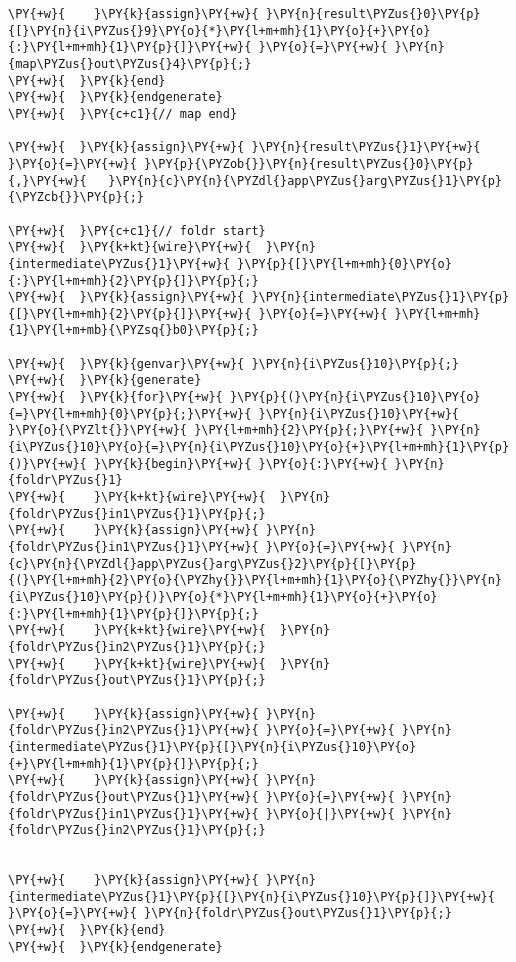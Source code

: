 {\begin{Verbatim}[commandchars=\\\{\}]
\PY{+w}{    }\PY{k}{assign}\PY{+w}{ }\PY{n}{result\PYZus{}0}\PY{p}{[}\PY{n}{i\PYZus{}9}\PY{o}{*}\PY{l+m+mh}{1}\PY{o}{+}\PY{o}{:}\PY{l+m+mh}{1}\PY{p}{]}\PY{+w}{ }\PY{o}{=}\PY{+w}{ }\PY{n}{map\PYZus{}out\PYZus{}4}\PY{p}{;}
\PY{+w}{  }\PY{k}{end}
\PY{+w}{  }\PY{k}{endgenerate}
\PY{+w}{  }\PY{c+c1}{// map end}

\PY{+w}{  }\PY{k}{assign}\PY{+w}{ }\PY{n}{result\PYZus{}1}\PY{+w}{ }\PY{o}{=}\PY{+w}{ }\PY{p}{\PYZob{}}\PY{n}{result\PYZus{}0}\PY{p}{,}\PY{+w}{   }\PY{n}{c}\PY{n}{\PYZdl{}app\PYZus{}arg\PYZus{}1}\PY{p}{\PYZcb{}}\PY{p}{;}

\PY{+w}{  }\PY{c+c1}{// foldr start}
\PY{+w}{  }\PY{k+kt}{wire}\PY{+w}{  }\PY{n}{intermediate\PYZus{}1}\PY{+w}{ }\PY{p}{[}\PY{l+m+mh}{0}\PY{o}{:}\PY{l+m+mh}{2}\PY{p}{]}\PY{p}{;}
\PY{+w}{  }\PY{k}{assign}\PY{+w}{ }\PY{n}{intermediate\PYZus{}1}\PY{p}{[}\PY{l+m+mh}{2}\PY{p}{]}\PY{+w}{ }\PY{o}{=}\PY{+w}{ }\PY{l+m+mh}{1}\PY{l+m+mb}{\PYZsq{}b0}\PY{p}{;}

\PY{+w}{  }\PY{k}{genvar}\PY{+w}{ }\PY{n}{i\PYZus{}10}\PY{p}{;}
\PY{+w}{  }\PY{k}{generate}
\PY{+w}{  }\PY{k}{for}\PY{+w}{ }\PY{p}{(}\PY{n}{i\PYZus{}10}\PY{o}{=}\PY{l+m+mh}{0}\PY{p}{;}\PY{+w}{ }\PY{n}{i\PYZus{}10}\PY{+w}{ }\PY{o}{\PYZlt{}}\PY{+w}{ }\PY{l+m+mh}{2}\PY{p}{;}\PY{+w}{ }\PY{n}{i\PYZus{}10}\PY{o}{=}\PY{n}{i\PYZus{}10}\PY{o}{+}\PY{l+m+mh}{1}\PY{p}{)}\PY{+w}{ }\PY{k}{begin}\PY{+w}{ }\PY{o}{:}\PY{+w}{ }\PY{n}{foldr\PYZus{}1}
\PY{+w}{    }\PY{k+kt}{wire}\PY{+w}{  }\PY{n}{foldr\PYZus{}in1\PYZus{}1}\PY{p}{;}
\PY{+w}{    }\PY{k}{assign}\PY{+w}{ }\PY{n}{foldr\PYZus{}in1\PYZus{}1}\PY{+w}{ }\PY{o}{=}\PY{+w}{ }\PY{n}{c}\PY{n}{\PYZdl{}app\PYZus{}arg\PYZus{}2}\PY{p}{[}\PY{p}{(}\PY{l+m+mh}{2}\PY{o}{\PYZhy{}}\PY{l+m+mh}{1}\PY{o}{\PYZhy{}}\PY{n}{i\PYZus{}10}\PY{p}{)}\PY{o}{*}\PY{l+m+mh}{1}\PY{o}{+}\PY{o}{:}\PY{l+m+mh}{1}\PY{p}{]}\PY{p}{;}
\PY{+w}{    }\PY{k+kt}{wire}\PY{+w}{  }\PY{n}{foldr\PYZus{}in2\PYZus{}1}\PY{p}{;}
\PY{+w}{    }\PY{k+kt}{wire}\PY{+w}{  }\PY{n}{foldr\PYZus{}out\PYZus{}1}\PY{p}{;}

\PY{+w}{    }\PY{k}{assign}\PY{+w}{ }\PY{n}{foldr\PYZus{}in2\PYZus{}1}\PY{+w}{ }\PY{o}{=}\PY{+w}{ }\PY{n}{intermediate\PYZus{}1}\PY{p}{[}\PY{n}{i\PYZus{}10}\PY{o}{+}\PY{l+m+mh}{1}\PY{p}{]}\PY{p}{;}
\PY{+w}{    }\PY{k}{assign}\PY{+w}{ }\PY{n}{foldr\PYZus{}out\PYZus{}1}\PY{+w}{ }\PY{o}{=}\PY{+w}{ }\PY{n}{foldr\PYZus{}in1\PYZus{}1}\PY{+w}{ }\PY{o}{|}\PY{+w}{ }\PY{n}{foldr\PYZus{}in2\PYZus{}1}\PY{p}{;}


\PY{+w}{    }\PY{k}{assign}\PY{+w}{ }\PY{n}{intermediate\PYZus{}1}\PY{p}{[}\PY{n}{i\PYZus{}10}\PY{p}{]}\PY{+w}{ }\PY{o}{=}\PY{+w}{ }\PY{n}{foldr\PYZus{}out\PYZus{}1}\PY{p}{;}
\PY{+w}{  }\PY{k}{end}
\PY{+w}{  }\PY{k}{endgenerate}


\end{Verbatim}}
